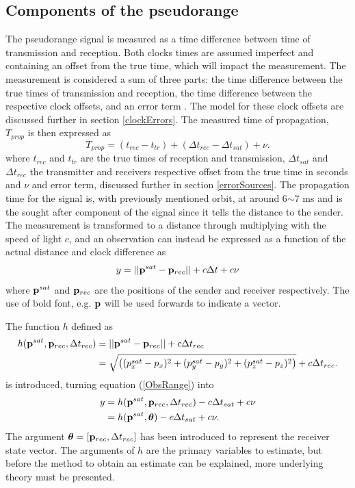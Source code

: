 \subsection{Components of the pseudorange} \label{pseudorangeComponents}
The pseudorange signal is measured as a time difference between time of transmission and reception. Both clocks times are assumed imperfect and containing an offset from the true time, which will impact the measurement. The measurement is considered a sum of three parts: the time difference between the true times of transmission and reception, the time difference between the respective clock offsets, and an error term \cite{6748618}. The model for these clock offsets are discussed further in section \ref{clockErrors}. The measured time of propagation, $T_{prop}$ is then expressed as
\begin{equation}\label{t_prop}
T_{prop}=(t_{rec}-t_{tr})+(\Delta t_{rec}-\Delta t_{sat})+\nu.
\end{equation}
where $t_{rec}$ and $t_{tr}$ are the true times of reception and transmission, $\Delta t_{sat}$ and $\Delta t_{rec}$ the transmitter and receivers respective offset from the true time in seconds and $\nu$ and error term, discussed further in section \ref{errorSources}. The propagation time for the signal is, with previously mentioned orbit, at around 6$\sim$7 ms and is the sought after component of the signal since it tells the distance to the sender. The measurement is transformed to a distance through multiplying with the speed of light $c$, and an observation can instead be expressed as a function of the actual distance and clock difference as
\begin{equation} \label{ObsRange}
y=||{\bf p}^{sat}-{\bf p}_{rec}||+c\Delta t+c\nu
\end{equation}
where ${\bf p}^{sat}$ and ${\bf p}_{rec}$ are the positions of the sender and receiver respectively. The use of bold font, e.g. $\bf p$ will be used forwards to indicate a vector. 
\par
The function $h$ defined as
\begin{align}\label{hModel}
h({\bf p}^{sat},{\bf p}_{rec},\Delta t_{rec}) &= ||{\bf p}^{sat}-{\bf p}_{rec}||+c\Delta t_{rec} \nonumber\\
				 &= \sqrt{\left((p^{sat}_x- p_x)^2+(p^{sat}_y-p_y)^2+(p^{sat}_z-p_z)^2\right)}+c\Delta t_{rec}.
\end{align}
is introduced, turning equation (\ref{ObsRange}) into
\begin{align} \label{singleObs}
y &=h({\bf p}^{sat}, {\bf p}_{rec},\Delta t_{rec})-c\Delta t_{sat} +c\nu\\
	&=h({\bf p}^{sat}, {\boldsymbol \theta })-c\Delta t_{sat} +c\nu.
\end{align}
The argument $\boldsymbol \theta=[{\bf p}_{rec},\Delta t_{rec}]$ has been introduced to represent the receiver state vector. The arguments of $h$ are the primary variables to estimate, but before the method to obtain an estimate can be explained, more underlying theory must be presented.

